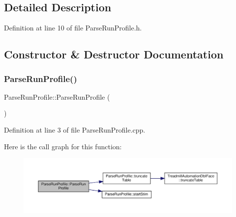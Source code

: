 \subsection{Detailed Description}


Definition at line 10 of file Parse\+Run\+Profile.\+h.



\subsection{Constructor \& Destructor Documentation}
\mbox{\label{class_parse_run_profile_aec4e56db3a472345a1460fc1e702cbec}} 
\subsubsection{\texorpdfstring{Parse\+Run\+Profile()}{ParseRunProfile()}}
{\footnotesize\ttfamily Parse\+Run\+Profile\+::\+Parse\+Run\+Profile (\begin{DoxyParamCaption}{ }\end{DoxyParamCaption})}



Definition at line 3 of file Parse\+Run\+Profile.\+cpp.

Here is the call graph for this function\+:
\nopagebreak
\begin{figure}[H]
\begin{center}
\leavevmode
\includegraphics[width=350pt]{class_parse_run_profile_aec4e56db3a472345a1460fc1e702cbec_cgraph}
\end{center}
\end{figure}
\mbox{\label{class_parse_run_profile_abbd0d62620a0b7b1754843544e57b166}} 
